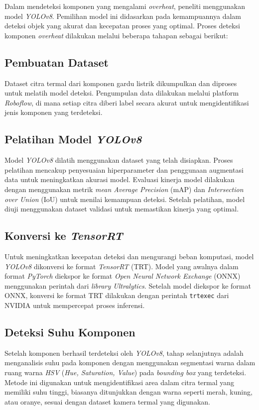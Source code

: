 Dalam mendeteksi komponen yang mengalami \emph{overheat}, peneliti menggunakan model \emph{YOLOv8}. Pemilihan model ini didasarkan pada kemampuannya dalam deteksi objek yang akurat dan kecepatan proses yang optimal. Proses deteksi komponen \emph{overheat} dilakukan melalui beberapa tahapan sebagai berikut:

\subsection{Pembuatan Dataset}
Dataset citra termal dari komponen gardu listrik dikumpulkan dan diproses untuk melatih model deteksi. Pengumpulan data dilakukan melalui platform \emph{Roboflow}, di mana setiap citra diberi label secara akurat untuk mengidentifikasi jenis komponen yang terdeteksi.

\subsection{Pelatihan Model \emph{YOLOv8}}
Model \emph{YOLOv8} dilatih menggunakan dataset yang telah disiapkan. Proses pelatihan mencakup penyesuaian hiperparameter dan penggunaan augmentasi data untuk meningkatkan akurasi model. Evaluasi kinerja model dilakukan dengan menggunakan metrik \emph{mean Average Precision} (mAP) dan \emph{Intersection over Union} (IoU) untuk menilai kemampuan deteksi. Setelah pelatihan, model diuji menggunakan dataset validasi untuk memastikan kinerja yang optimal.

\subsection{Konversi ke \emph{TensorRT}}
Untuk meningkatkan kecepatan deteksi dan mengurangi beban komputasi, model \emph{YOLOv8} dikonversi ke format \emph{TensorRT} (TRT). Model yang awalnya dalam format \emph{PyTorch} diekspor ke format \emph{Open Neural Network Exchange} (ONNX) menggunakan perintah dari \emph{library Ultralytics}. Setelah model diekspor ke format ONNX, konversi ke format TRT dilakukan dengan perintah \texttt{trtexec} dari NVIDIA untuk mempercepat proses inferensi.

\subsection{Deteksi Suhu Komponen}
Setelah komponen berhasil terdeteksi oleh \emph{YOLOv8}, tahap selanjutnya adalah menganalisis suhu pada komponen dengan menggunakan segmentasi warna dalam ruang warna \emph{HSV} (\emph{Hue, Saturation, Value}) pada \emph{bounding box} yang terdeteksi. Metode ini digunakan untuk mengidentifikasi area dalam citra termal yang memiliki suhu tinggi, biasanya ditunjukkan dengan warna seperti merah, kuning, atau oranye, sesuai dengan dataset kamera termal yang digunakan.

